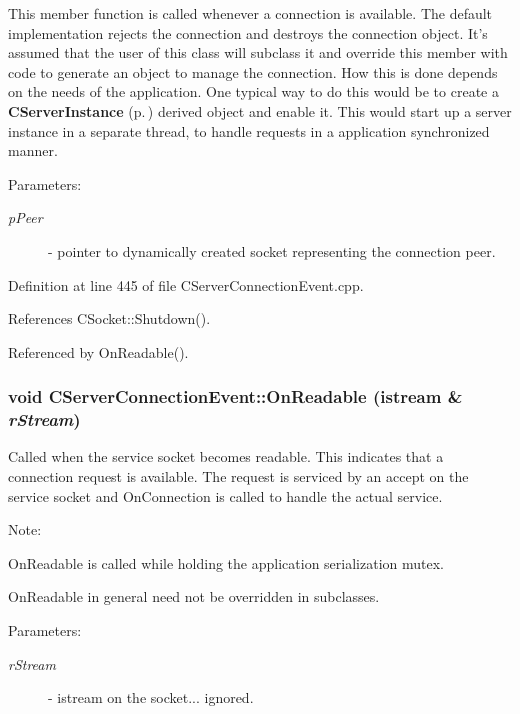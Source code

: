 This member function is called whenever a connection is available. The default implementation rejects the connection and destroys the connection object. It's assumed that the user of this class will subclass it and override this member with code to generate an object to manage the connection. How this is done depends on the needs of the application. One typical way to do this would be to create a {\bf CServer\-Instance} {\rm (p.\,\pageref{classCServerInstance})} derived object and enable it. This would start up a server instance in a separate thread, to handle requests in a application synchronized manner.\begin{Desc}
\item[Parameters: ]\par
\begin{description}
\item[{\em 
p\-Peer}]- pointer to dynamically created socket representing the connection peer. \end{description}
\end{Desc}


Definition at line 445 of file CServer\-Connection\-Event.cpp.

References CSocket::Shutdown().

Referenced by On\-Readable().
\subsubsection{\setlength{\rightskip}{0pt plus 5cm}void CServer\-Connection\-Event::On\-Readable (istream \& {\em r\-Stream})\hspace{0.3cm}{\tt  [virtual]}}\label{classCServerConnectionEvent_a13}


Called when the service socket becomes readable. This indicates that a connection request is available. The request is serviced by an accept on the service socket and On\-Connection is called to handle the actual service.  \begin{Desc}
\item[Note: ]\par
On\-Readable is called while holding the application serialization mutex. \par
On\-Readable in general need not be overridden in subclasses.\end{Desc}
\begin{Desc}
\item[Parameters: ]\par
\begin{description}
\item[{\em 
r\-Stream}]- istream on the socket... ignored. \end{description}
\end{Desc}


